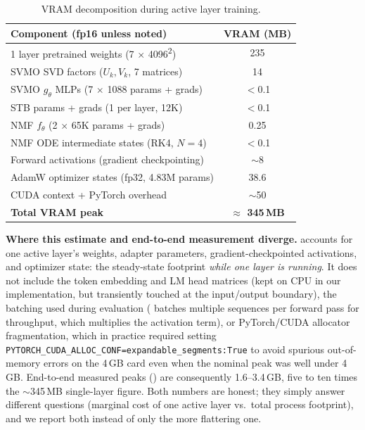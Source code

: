 \documentclass[conference]{IEEEtran}
\begin{document}
\begin{table}[t]
\centering
\caption{VRAM decomposition during active layer training.}
\label{tab:vram_detail}
\setlength{\tabcolsep}{3pt}
\begin{tabular}{@{}lc@{}}
\toprule
\textbf{Component (fp16 unless noted)} & \textbf{VRAM (MB)} \\
\midrule
1 layer pretrained weights (7 $\times$ 4096\textsuperscript{2}) & 235 \\
SVMO SVD factors ($U_k, V_k$, 7 matrices) & 14 \\
SVMO $g_\theta$ MLPs (7 $\times$ 1088 params + grads) & $<$0.1 \\
STB params + grads (1 per layer, 12K) & $<$0.1 \\
NMF $f_\theta$ (2 $\times$ 65K params + grads) & 0.25 \\
NMF ODE intermediate states (RK4, $N{=}4$) & $<$0.1 \\
Forward activations (gradient checkpointing) & $\sim$8 \\
AdamW optimizer states (fp32, 4.83M params) & 38.6 \\
CUDA context + PyTorch overhead & $\sim$50 \\
\midrule
\textbf{Total VRAM peak} & \textbf{$\approx$ 345\,MB} \\
\bottomrule
\end{tabular}
\end{table}

\textbf{Where this estimate and end-to-end measurement diverge.}  accounts for one active layer's weights, adapter parameters, gradient-checkpointed activations, and optimizer state: the steady-state footprint \emph{while one layer is running}. It does not include the token embedding and LM head matrices (kept on CPU in our implementation, but transiently touched at the input/output boundary), the batching used during evaluation ( batches multiple sequences per forward pass for throughput, which multiplies the activation term), or PyTorch/CUDA allocator fragmentation, which in practice required setting \texttt{PYTORCH\_CUDA\_ALLOC\_CONF=}\allowbreak\texttt{expandable\_segments:True} to avoid spurious out-of-memory errors on the 4\,GB card even when the nominal peak was well under 4\,GB. End-to-end measured peaks () are consequently 1.6--3.4\,GB, five to ten times the $\sim$345\,MB single-layer figure. Both numbers are honest; they simply answer different questions (marginal cost of one active layer vs.\ total process footprint), and we report both instead of only the more flattering one.
\end{document}
